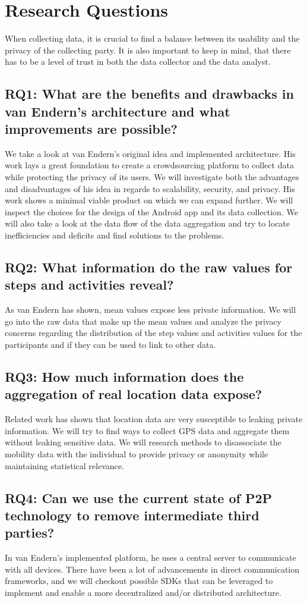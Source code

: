\section{Research Questions}
When collecting data, it is crucial to find a balance between its usability and the privacy of the collecting party. It is also important to keep in mind, that there has to be a level of trust in both the data collector and the data analyst.
\subsection*{RQ1: What are the benefits and drawbacks in van Endern's architecture and what improvements are possible?}
We take a look at van Endern's original idea and implemented architecture. His work lays a great foundation to create a crowdsourcing platform to collect data while protecting the privacy of its users. We will investigate both the advantages and disadvantages of his idea in regards to scalability, security, and privacy. His work shows a minimal viable product on which we can expand further. We will inspect the choices for the design of the Android app and its data collection. We will also take a look at the data flow of the data aggregation and try to locate inefficiencies and deficits and find solutions to the problems.
\subsection*{RQ2: What information do the raw values for steps and activities reveal?}
As van Endern has shown, mean values expose less private information. We will go into the raw data that make up the mean values and analyze the privacy concerns regarding the distribution of the step values and activities values for the participants and if they can be used to link to other data.
\subsection*{RQ3: How much information does the aggregation of real location data expose?}
Related work has shown that location data are very susceptible to leaking private information. We will try to find ways to collect GPS data and aggregate them without leaking sensitive data. We will research methods to disassociate the mobility data with the individual to provide privacy or anonymity while maintaining statistical relevance.
\subsection*{RQ4: Can we use the current state of P2P technology to remove intermediate third parties?}
In van Endern's implemented platform, he uses a central server to communicate with all devices. There have been a lot of advancements in direct communication frameworks, and we will checkout possible SDKs that can be leveraged to implement and enable a more decentralized and/or distributed architecture.

